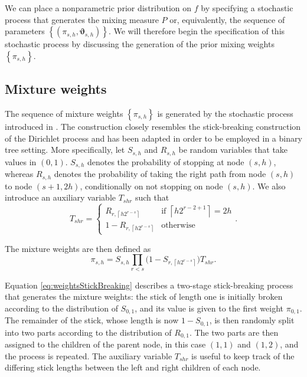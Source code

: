 \documentclass[nonatbib]{elsarticle}
\begin{document}
We can place a nonparametric prior distribution on $f$ by specifying a stochastic process that generates the mixing measure $P$ or, equivalently, the sequence of parameters $\left\{ (\pi_{s,h}, \bm{\vartheta}_{s,h}) \right\}$.
We will therefore begin the specification of this stochastic process by discussing the generation of the prior mixing weights $\left\{ \pi_{s,h} \right\}$.

\subsection{Mixture weights}\label{ssec:mixture-weights}
The sequence of mixture weights $\left\{ \pi_{s,h} \right\}$ is generated by the stochastic process introduced in \textcite{canale2016b}.
The construction closely resembles the stick-breaking construction of the Dirichlet process \autocite{sethuraman1994} and has been adapted in order to be employed in a binary tree setting.
More specifically, let $S_{s,h}$ and $R_{s,h}$ be random variables that take values in $(0,1)$.
$S_{s,h}$ denotes the probability of stopping at node $(s,h)$, whereas $R_{s,h}$ denotes the probability of taking the right path from node $(s,h)$ to node $(s+1, 2h)$, conditionally on not stopping on node $(s,h)$.
We also introduce an auxiliary variable $T_{shr}$ such that
\[
    T_{shr} = \begin{cases}
        R_{r, \left\lceil h 2^{r-s} \right\rceil } & \text{if } \left\lceil h 2^{r-2+1} \right\rceil = 2h\\

        1 - R_{r, \left\lceil h 2^{r-s} \right\rceil } & \text{otherwise}
    \end{cases}.
\]

The mixture weights are then defined as
\begin{equation}
    \label{eq:weightsStickBreaking}
    \pi_{s,h} = S_{s,h} \prod_{r < s} \big( 1 - S_{r, \left\lceil h 2^{r-s} \right\rceil } \big)T_{shr}.
\end{equation}


Equation \eqref{eq:weightsStickBreaking} describes a two-stage stick-breaking process that generates the mixture weights:
the stick of length one is initially broken according to the distribution of $S_{0,1}$, and its value is given to the first weight $\pi_{0,1}$.
The remainder of the stick, whose length is now $1 - S_{0,1}$, is then randomly split into two parts according to the distribution of $R_{0,1}$.
The two parts are then assigned to the children of the parent node, in this case $(1,1)$ and $(1,2)$, and the process is repeated.
The auxiliary variable $T_{shr}$ is useful to keep track of the differing stick lengths between the left and right children of each node.\\
\end{document}
